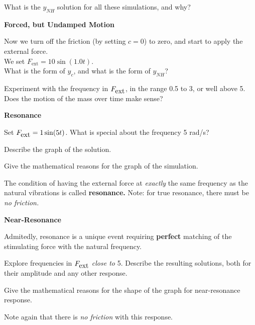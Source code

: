 \vfill

What is the $y_{NH}$ solution for all these simulations, and why?

\vfill

\newpage

{\bf Forced, but Undamped Motion}

Now we turn off the friction (by setting $c=0$) to zero, and
start to apply the external force. \\
We set $F_{\mbox{ext}} = 10 \sin(1.0 t)$.   \\
What is the form of $y_c$, and what is the form of $y_{NH}$?

\vfill

Experiment with the frequency in $F_{\mbox{ext}}$, in the range 0.5 to 3, or well
above 5.  Does the motion of the mass over time make sense?

\vfill

\newpage


{\bf Resonance}

Set $F_{\mbox{ext}} = 1 \sin(5t)$.  What is special about the
  frequency 5 rad/s?

\vfill

Describe the graph of the solution.

\vfill

Give the mathematical reasons for the graph of the
  simulation.\\

\vfill

The condition of having the external force at {\em exactly} the same
frequency as the natural vibrations is called {\bf resonance.}  Note:
for true resonance, there must be {\em no friction.}

\newpage

{\bf Near-Resonance}

Admitedly, resonance is a unique event requiring {\bf perfect}
matching of the stimulating force with the natural frequency.

Explore frequencies in $F_{\mbox{ext}}$ {\em close to} 5.  Describe
  the resulting solutions, both for their amplitude and any other
  response.

\vfill

Give the mathematical reasons for the shape of the graph
  for near-resonance response.

\vfill

Note again that there is {\em no friction} with this response.

